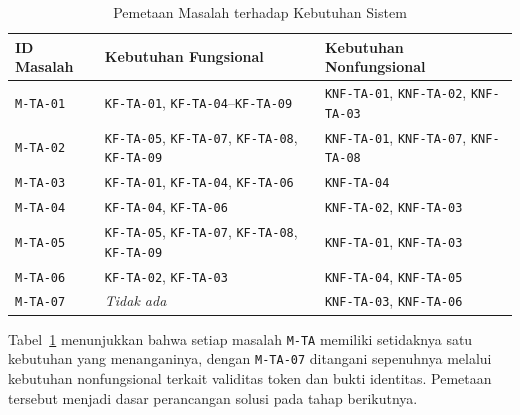 \begin{table}[H]
	\centering
	\caption{Pemetaan Masalah terhadap Kebutuhan Sistem}
	\label{tab:pemetaan-masalah-kebutuhan}
	\small
	\begin{tabular}{|p{}|p{}|p{}|}
		\hline
		\textbf{ID Masalah} & \textbf{Kebutuhan Fungsional}                                              & \textbf{Kebutuhan Nonfungsional}                           \\ \hline
		\texttt{M-TA-01}    & \texttt{KF-TA-01}, \texttt{KF-TA-04}--\texttt{KF-TA-09}                    & \texttt{KNF-TA-01}, \texttt{KNF-TA-02}, \texttt{KNF-TA-03} \\ \hline
		\texttt{M-TA-02}    & \texttt{KF-TA-05}, \texttt{KF-TA-07}, \texttt{KF-TA-08}, \texttt{KF-TA-09} & \texttt{KNF-TA-01}, \texttt{KNF-TA-07}, \texttt{KNF-TA-08} \\ \hline
		\texttt{M-TA-03}    & \texttt{KF-TA-01}, \texttt{KF-TA-04}, \texttt{KF-TA-06}                    & \texttt{KNF-TA-04}                                         \\ \hline
		\texttt{M-TA-04}    & \texttt{KF-TA-04}, \texttt{KF-TA-06}                                       & \texttt{KNF-TA-02}, \texttt{KNF-TA-03}                     \\ \hline
		\texttt{M-TA-05}    & \texttt{KF-TA-05}, \texttt{KF-TA-07}, \texttt{KF-TA-08}, \texttt{KF-TA-09} & \texttt{KNF-TA-01}, \texttt{KNF-TA-03}                     \\ \hline
		\texttt{M-TA-06}    & \texttt{KF-TA-02}, \texttt{KF-TA-03}                                       & \texttt{KNF-TA-04}, \texttt{KNF-TA-05}                     \\ \hline
		\texttt{M-TA-07}    & \textit{Tidak ada}                                                         & \texttt{KNF-TA-03}, \texttt{KNF-TA-06}                     \\ \hline
	\end{tabular}
\end{table}

Tabel~\ref{tab:pemetaan-masalah-kebutuhan} menunjukkan bahwa setiap masalah \texttt{M-TA} memiliki setidaknya satu kebutuhan yang menanganinya, dengan \texttt{M-TA-07} ditangani sepenuhnya melalui kebutuhan nonfungsional terkait validitas token dan bukti identitas. Pemetaan tersebut menjadi dasar perancangan solusi pada tahap berikutnya.
